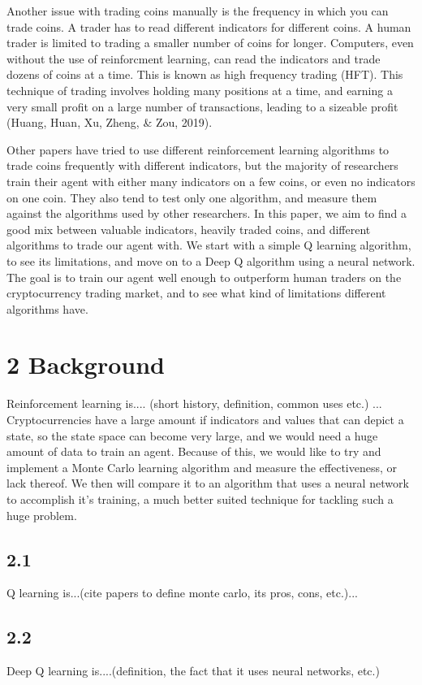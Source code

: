 \documentclass[letterpaper]{article}
\begin{document}
Another issue with trading coins manually is the frequency in which you can trade coins. A trader has to read different indicators for different coins. A human trader is limited to trading a smaller number of coins for longer. Computers, even without the use of reinforcment learning, can read the indicators and trade dozens of coins at a time. This is known as high frequency trading (HFT). This technique of trading involves holding many positions at a time, and earning a very small profit on a large number of transactions, leading to a sizeable profit (Huang, Huan, Xu, Zheng, \& Zou, 2019).

Other papers have tried to use different reinforcement learning algorithms to trade coins frequently with different indicators, but the majority of researchers train their agent with either many indicators on a few coins, or even no indicators on one coin. They also tend to test only one algorithm, and measure them against the algorithms used by other researchers. In this paper, we aim to find a good mix between valuable indicators, heavily traded coins, and different algorithms to trade our agent with. We start with a simple Q learning algorithm, to see its limitations, and move on to a Deep Q algorithm using a neural network. The goal is to train our agent well enough to outperform human traders on the cryptocurrency trading market, and to see what kind of limitations different algorithms have.

\section{2 Background}
Reinforcement learning is.... (short history, definition, common uses etc.)
... Cryptocurrencies have a large amount if indicators and values that can depict a state, so the state space can become very large, and we would need a huge amount of data to train an agent. Because of this, we would like to try and implement a Monte Carlo learning algorithm and measure the effectiveness, or lack thereof. We then will compare it to an algorithm that uses a neural network to accomplish it's training, a much better suited technique for tackling such a huge problem.
\subsection{2.1}
Q learning is...(cite papers to define monte carlo, its pros, cons, etc.)...

\subsection{2.2} 
Deep Q learning is....(definition, the fact that it uses neural networks, etc.)
\end{document}
